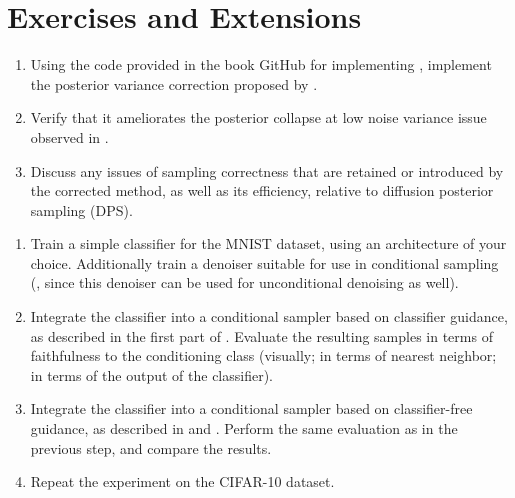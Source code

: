 \documentclass[../../book-main.tex]{subfiles}
\begin{document}
\section{Exercises and Extensions}


\begin{exercise}

  \begin{enumerate}
    \item Using the code provided in the book GitHub for implementing
      , implement the
      posterior variance correction proposed by \textcite{rozet2024learning}.
    \item Verify that it ameliorates the posterior collapse at low noise
      variance issue observed in
      .
    \item Discuss any issues of sampling correctness that are retained or
      introduced by the corrected method, as well as its efficiency, relative to
      diffusion posterior sampling (DPS).
  \end{enumerate}

\end{exercise}

\begin{exercise}
  \begin{enumerate}
    \item Train a simple classifier for the MNIST dataset, using an architecture
      of your choice. Additionally train a denoiser suitable for use in
      conditional sampling (,
      since this denoiser can be used for unconditional denoising as well).
    \item Integrate the classifier into a conditional sampler based on
      classifier guidance, as described in the first part of .
      Evaluate the resulting samples in terms of faithfulness to the
      conditioning class (visually; in terms of nearest neighbor; in terms of
      the output of the classifier).
    \item Integrate the classifier into a conditional sampler based on
      classifier-free guidance, as described in  and
      . Perform the same
      evaluation as in the previous step, and compare the results.
    \item Repeat the experiment on the CIFAR-10 dataset.
  \end{enumerate}


\end{exercise}
\end{document}
